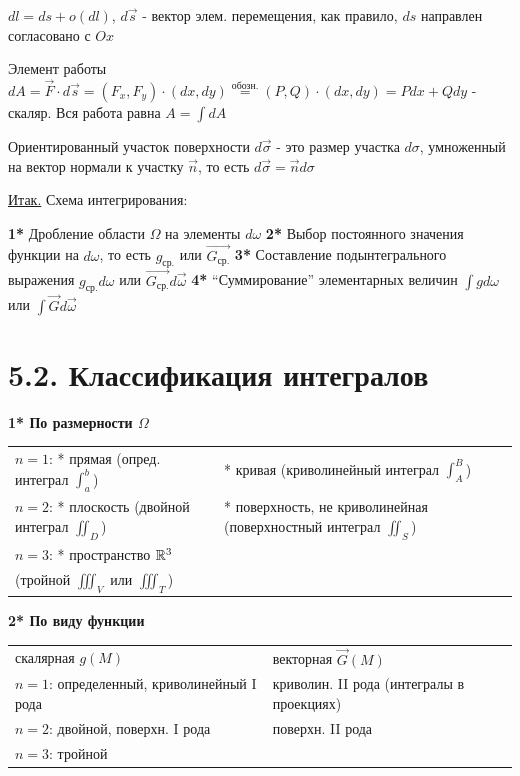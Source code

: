 \documentclass[12pt]{article}
\begin{document}
    $dl = ds + o(dl)$, $d\overrightarrow{s}$ - вектор элем. перемещения, как правило, $ds$ направлен согласовано с $Ox$

    Элемент работы $dA = \overrightarrow{F} \cdot d\overrightarrow{s} = (F_x, F_y) \cdot (dx, dy) \stackrel{\text{обозн.}}{=}
    (P, Q) \cdot (dx, dy) = Pdx + Qdy$ - скаляр. Вся работа равна $A = \int dA$

    \Nota Ориентированный участок поверхности $d\overrightarrow{\sigma}$ - это размер участка $d\sigma$, умноженный на вектор нормали к участку $\overrightarrow{n}$,
    то есть $d\overrightarrow{\sigma} = \overrightarrow{n}d\sigma$

    \underline{Итак.} Схема интегрирования:

    \textbf{1*} Дробление области $\Omega$ на элементы $d\omega$
    \textbf{2*} Выбор постоянного значения функции на $d\omega$, то есть $g_{\text{ср.}}$ или $\overrightarrow{G_\text{ср.}}$
    \textbf{3*} Составление подынтегрального выражения $g_{\text{ср.}}d\omega$ или $\overrightarrow{G_\text{ср.}}d\overrightarrow{\omega}$
    \textbf{4*} \enquote{Суммирование} элементарных величин $\int gd\omega$ или $\int \overrightarrow{G}d\overrightarrow{\omega}$


    \section{5.2. Классификация интегралов}

    \textbf{1* По размерности $\Omega$}

    \begin{tabular}{p{8cm}p{8cm}}
        $n = 1$: * прямая (опред. интеграл $\int_a^b$)    & * кривая (криволинейный интеграл $\int_A^B$)                       \\

        $n = 2$: * плоскость (двойной интеграл $\iint_D$) & * поверхность, не криволинейная (поверхностный интеграл $\iint_S$) \\

        $n = 3$: * пространство $\mathbb{R}^3$  \\
        (тройной $\iiint_V$ или $\iiint_T$)

    \end{tabular}


    \textbf{2* По виду функции}

    \begin{tabular}{p{8cm}p{8cm}}
        скалярная $g(M)$                            & векторная $\overrightarrow{G}(M)$         \\

        $n = 1$: определенный, криволинейный I рода & криволин. II рода (интегралы в проекциях) \\

        $n = 2$: двойной, поверхн. I рода            & поверхн. II рода                          \\

        $n = 3$: тройной
    \end{tabular}
\end{document}
